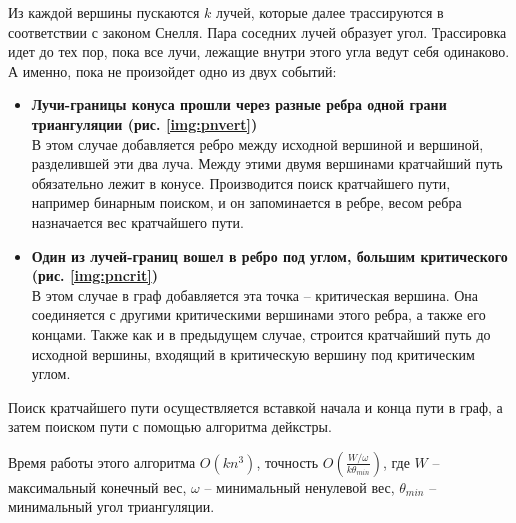 Из каждой вершины пускаются $k$ лучей, которые далее трассируются в соответствии
с законом Снелля. Пара соседних лучей образует угол. Трассировка идет до тех пор,
пока все лучи, лежащие внутри этого угла ведут себя одинаково. А именно, пока не
произойдет одно из двух событий:
\begin{itemize}
\item \textbf{Лучи-границы конуса прошли через разные
ребра одной грани триангуляции (рис. \ref{img:pnvert})}\\
В этом случае добавляется ребро между исходной вершиной и вершиной, разделившей
эти два луча. Между этими двумя вершинами кратчайший путь обязательно лежит в
конусе. Производится поиск кратчайшего пути, например бинарным поиском, и он
запоминается в ребре, весом ребра назначается вес кратчайшего пути.
\item \textbf{Один из лучей-границ вошел в ребро под углом,
большим критического (рис. \ref{img:pncrit})} \\
В этом случае в граф добавляется эта точка -- критическая вершина.
Она соединяется с другими критическими вершинами этого ребра, а также его концами.
Также как и в предыдущем случае, строится кратчайший путь до исходной вершины,
входящий в критическую вершину под критическим углом.
\end{itemize}


Поиск кратчайшего пути осуществляется вставкой начала и конца пути в граф, а затем
поиском пути с помощью алгоритма дейкстры.

Время работы этого алгоритма $O(kn^3)$, точность $O(\frac{W/\omega}{k\theta_{min}})$,
где $W$ -- максимальный конечный вес, $\omega$ -- минимальный ненулевой вес,
$\theta_{min}$ -- минимальный угол триангуляции.

\FloatBarrier
